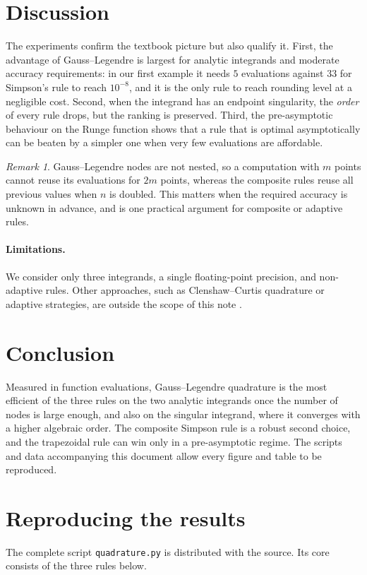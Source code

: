 \documentclass[10pt,twocolumn,a4paper]{article}
\theoremstyle{plain}
\theoremstyle{remark}
\newtheorem{remark}{Remark}
\begin{document}
\section{Discussion}
The experiments confirm the textbook picture but also qualify it.
First, the advantage of Gauss--Legendre is largest for analytic integrands and moderate accuracy requirements: in our first example it needs $5$ evaluations against $33$ for Simpson's rule to reach $10^{-8}$, and it is the only rule to reach rounding level at a negligible cost.
Second, when the integrand has an endpoint singularity, the \emph{order} of every rule drops, but the ranking is preserved.
Third, the pre-asymptotic behaviour on the Runge function shows that a rule that is optimal asymptotically can be beaten by a simpler one when very few evaluations are affordable.

\begin{remark}
Gauss--Legendre nodes are not nested, so a computation with $m$ points cannot reuse its evaluations for $2m$ points, whereas the composite rules reuse all previous values when $n$ is doubled. This matters when the required accuracy is unknown in advance, and is one practical argument for composite or adaptive rules.
\end{remark}

\paragraph{Limitations.} We consider only three integrands, a single floating-point precision, and non-adaptive rules. Other approaches, such as Clenshaw--Curtis quadrature or adaptive strategies, are outside the scope of this note \citep{trefethen2008}.

\section{Conclusion}
Measured in function evaluations, Gauss--Legendre quadrature is the most efficient of the three rules on the two analytic integrands once the number of nodes is large enough, and also on the singular integrand, where it converges with a higher algebraic order. The composite Simpson rule is a robust second choice, and the trapezoidal rule can win only in a pre-asymptotic regime. The scripts and data accompanying this document allow every figure and table to be reproduced.

\appendix
\section{Reproducing the results}
The complete script \texttt{quadrature.py} is distributed with the source. Its core consists of the three rules below.
\end{document}
